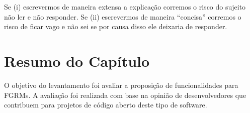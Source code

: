 Se (i) escrevermos de maneira extensa a explicação corremos o risco do sujeito
não ler e não responder. Se (ii) escrevermos de maneira ``concisa'' corremos o
risco de ficar vago e não sei se por causa disso ele deixaria de responder.

\section{Resumo do Capítulo}
\label{sec:sug_melhoria_resumo}

O objetivo do levantamento foi avaliar a proposição de funcionalidades para
FGRMs. A avaliação foi realizada com base na opinião de desenvolvedores que
contribuem para projetos de código aberto deste tipo de software.
